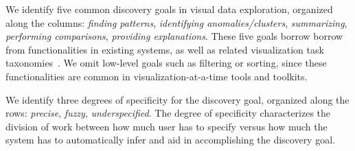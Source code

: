 \par
 We identify five 
common discovery goals in visual data exploration, organized
along the columns:
{\em finding patterns}, {\em identifying anomalies/clusters}, {\em summarizing}, 
{\em performing comparisons}, {\em providing explanations}.
These five goals borrow borrow from functionalities in existing
systems, as well as related visualization task taxonomies~\cite{Heer2012,Amar2005}.
We omit low-level goals such as filtering or sorting, since
these functionalities are common in 
visualization-at-a-time tools and toolkits.

\par 
 We identify three degrees of specificity
for the discovery goal, organized along the rows:
{\em precise}, {\em fuzzy}, {\em underspecified}.
The degree of specificity characterizes the division
of work between how much user has to specify
versus how much the system has to automatically
infer and aid in accomplishing the discovery goal. 

\newpage





